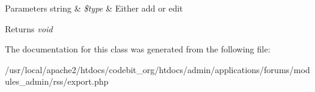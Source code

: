 \begin{DoxyParams}[1]{Parameters}
string & {\em \$type} & Either add or edit \\
\hline
\end{DoxyParams}
\begin{DoxyReturn}{Returns}
{\itshape void} 
\end{DoxyReturn}


The documentation for this class was generated from the following file\-:\begin{DoxyCompactItemize}
\item 
/usr/local/apache2/htdocs/codebit\-\_\-org/htdocs/admin/applications/forums/modules\-\_\-admin/rss/export.\-php\end{DoxyCompactItemize}
